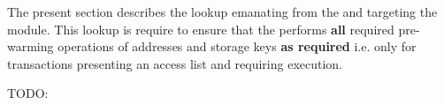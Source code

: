 The present section describes the lookup emanating from the \rlpTxnMod{} and targeting the \hubMod{} module. 
This lookup is require to ensure that the \hubMod{} performs \textbf{all} required pre-warming operations of addresses and storage keys \textbf{as required} i.e. only for transactions presenting an access list and requiring \evm{} execution.

TODO:

